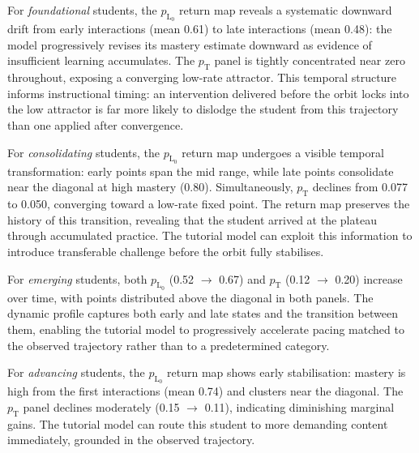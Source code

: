 \documentclass[runningheads]{llncs}
\begin{document}
For \textit{foundational} students, the $p_{\text{L}_0}$ return map reveals a systematic downward drift from early interactions (mean 0.61) to late interactions (mean 0.48): the model progressively revises its mastery estimate downward as evidence of insufficient learning accumulates. The $p_{\text{T}}$ panel is tightly concentrated near zero throughout, exposing a converging low-rate attractor. This temporal structure informs instructional timing: an intervention delivered before the orbit locks into the low attractor is far more likely to dislodge the student from this trajectory than one applied after convergence.

For \textit{consolidating} students, the $p_{\text{L}_0}$ return map undergoes a visible temporal transformation: early points span the mid range, while late points consolidate near the diagonal at high mastery (0.80). Simultaneously, $p_{\text{T}}$ declines from 0.077 to 0.050, converging toward a low-rate fixed point. The return map preserves the history of this transition, revealing that the student arrived at the plateau through accumulated practice. The tutorial model can exploit this information to introduce transferable challenge before the orbit fully stabilises.

For \textit{emerging} students, both $p_{\text{L}_0}$ (0.52 $\to$ 0.67) and $p_{\text{T}}$ (0.12 $\to$ 0.20) increase over time, with points distributed above the diagonal in both panels. The dynamic profile captures both early and late states and the transition between them, enabling the tutorial model to progressively accelerate pacing matched to the observed trajectory rather than to a predetermined category.

For \textit{advancing} students, the $p_{\text{L}_0}$ return map shows early stabilisation: mastery is high from the first interactions (mean 0.74) and clusters near the diagonal. The $p_{\text{T}}$ panel declines moderately (0.15 $\to$ 0.11), indicating diminishing marginal gains. The tutorial model can route this student to more demanding content immediately, grounded in the observed trajectory.
\end{document}
